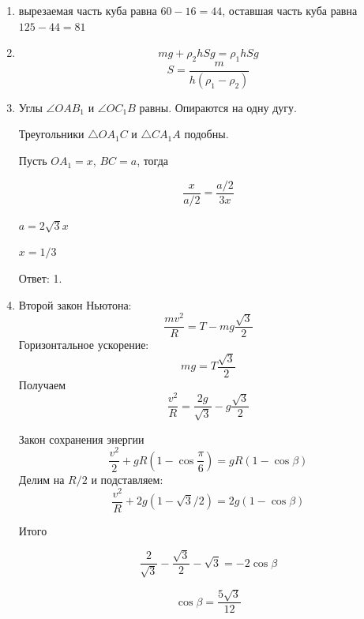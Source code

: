 \documentclass[12pt]{article}
\begin{document}
\begin{enumerate}
  \item вырезаемая часть куба равна $60 - 16 = 44$, оставшая часть куба равна  $125 - 44 = 81$
  \item 
  \[ 
    mg + \rho_2 h Sg = \rho_1 h S g
  \]
  \[
    S = \frac{m}{h(\rho_1 - \rho_2)}
  \]
  \item Углы $\angle OAB_1$ и $\angle OC_1B$ равны. Опираются на одну дугу. 

  Треугольники $\triangle OA_1C$ и $\triangle CA_1A$ подобны.
  
  Пусть $OA_1 = x$, $BC = a$, тогда 
  
  \[
  \frac{x}{a/2} = \frac{a/2}{3x}  
  \]
  
  $a = 2\sqrt{3}x$
  
  $x=1/3$
  
  Ответ: 1.
  
  \item Второй закон Ньютона:
  \[
  \frac{mv^2}{R} = T - mg \frac{\sqrt{3}}{2} 
  \]
  Горизонтальное ускорение:
  \[
  mg = T \frac{\sqrt{3}}{2}  
  \]
  Получаем 
  \[
  \frac{v^2}{R} = \frac{2g}{\sqrt{3}} - g \frac{\sqrt{3}}{2}  
  \]

  Закон сохранения энергии
  \[
  \frac{v^2}{2} +gR\left(1- \cos \frac{\pi}{6} \right)  = gR(1-\cos\beta)  
  \]
  Делим на $R/2$ и подставляем:
  \[
  \frac{v^2}{R} +2g(1- \sqrt{3}/2)  = 2g(1-\cos\beta)  
  \]

  Итого

  \[
  \frac{2}{\sqrt{3}} - \frac{\sqrt{3}}{2} - \sqrt{3} = -2\cos\beta  
  \]

  \[
  \cos\beta = \frac{5\sqrt{3}}{12}
  \]

\end{enumerate} 
\end{document}
